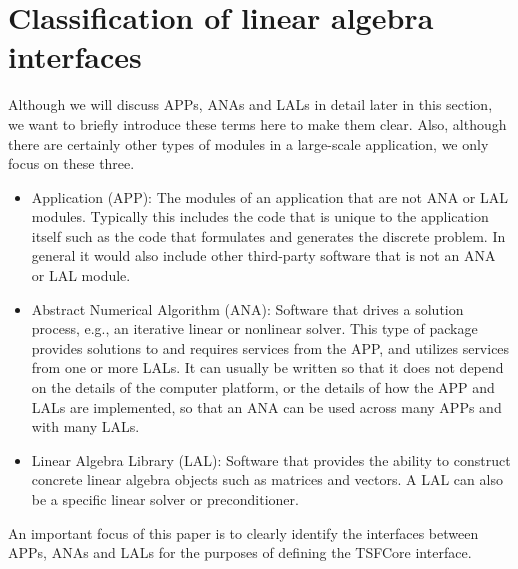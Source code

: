 %
\section{Classification of linear algebra interfaces}
\label{tsfcore:sec:classification_of_lin_alg_itfc}
%

Although we will discuss APPs, ANAs and LALs in detail later in this
section, we want to briefly introduce these terms here to make them
clear.  Also, although there are certainly other types of modules in a
large-scale application, we only focus on these three.
\begin{itemize}
\item Application (APP):  The modules of an application that are not
ANA or LAL modules.  Typically this includes the code that is unique
to the application itself such as the code that formulates and
generates the discrete problem.  In general it would also include
other third-party software that is not an ANA or LAL module.
\item Abstract Numerical Algorithm (ANA):  Software that drives a 
solution process, e.g., an iterative linear or nonlinear solver.  This
type of package provides solutions to and requires services from the
APP, and utilizes services from one or more LALs.  It can usually be
written so that it does not depend on the details of the computer
platform, or the details of how the APP and LALs are implemented, so
that an ANA can be used across many APPs and with many LALs.
\item Linear Algebra Library (LAL): Software that provides the 
ability to construct
concrete linear algebra objects such as matrices and vectors.  
A LAL can also be a specific linear solver or preconditioner.
\end{itemize}

An important focus of this paper is to clearly identify the interfaces
between APPs, ANAs and LALs for the purposes of defining the TSFCore
interface.

